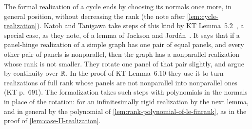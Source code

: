 The formal realization of a cycle ends by choosing its normals once
more, in general position, without decreasing the rank (the note after
\cref{lem:cycle-realization}). Katoh and Tanigawa take steps of this
kind by KT Lemma~5.2~\cite[p.~669]{katohTanigawa2011}, a special case,
as they note, of a lemma of Jackson and
Jord\'an~\cite[Lemma~7.1]{jacksonJordan2009}. It says that if a
panel-hinge realization of a simple graph has one pair of equal panels,
and every other pair of panels is nonparallel, then the graph has a
nonparallel realization whose rank is not smaller. They rotate one
panel of that pair slightly, and argue by continuity over ${\mathbb{R}}$. In the
proof of KT Lemma~6.10 they use it to turn realizations of full rank
whose panels are not nonparallel into nonparallel ones (KT p.~691).
The formalization takes such steps with polynomials in the normals in
place of the rotation: for an infinitesimally rigid realization by the
next lemma, and in general by the polynomial of
\cref{lem:rank-polynomial-of-le-finrank}, as in the proof of
\cref{lem:case-II-realization}.

